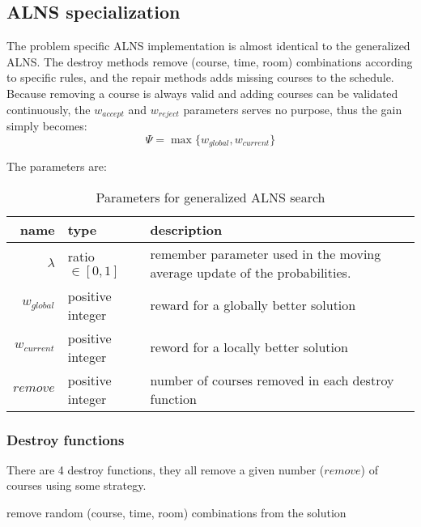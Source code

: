 \subsection{ALNS specialization}

The problem specific ALNS implementation is almost identical to the generalized ALNS. The destroy methods remove (course, time, room) combinations according to specific rules, and the repair methods adds missing courses to the schedule. Because removing a course is always valid and adding courses can be validated continuously, the $w_{accept}$ and $w_{reject}$ parameters serves no purpose, thus the gain simply becomes:
\begin{equation}
\Psi = \max\{w_{global}, w_{current}\}
\end{equation}

The parameters are:

\begin{table}[H]
\centering
\begin{tabular}{r|p{2.5cm}|p{6cm}}
	name & type & description \\ \hline
	$\lambda$ & ratio $\in [0, 1]$ & remember parameter used in the moving average update of the probabilities. \\
	$w_{global}$ & positive integer & reward for a globally better solution \\
	$w_{current}$ & positive integer & reword for a locally better solution \\
	$remove$ & positive integer & number of courses removed in each destroy function
\end{tabular}
\caption{Parameters for generalized ALNS search}
\end{table}

\subsubsection{Destroy functions}

There are 4 destroy functions, they all remove a given number ($remove$) of courses using some strategy.

\begin{algorithm}[H]
  \caption{remove random (course, time, room) combinations from the solution}
  \begin{algorithmic}[1]
        \State {}
      \EndFor
    \EndFunction
  \end{algorithmic}
\end{algorithm}

